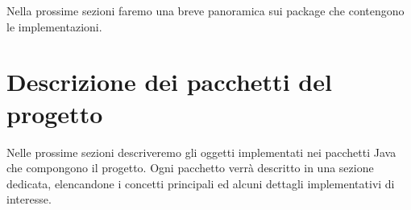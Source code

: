 \documentclass[twoside,openright,titlepage,fleqn,
	headinclude,11pt,a4paper,BCOR5mm,footinclude
	]{scrbook}
\begin{document}


% 

Nella prossime sezioni faremo una breve panoramica sui package che
contengono le implementazioni.

\section{Descrizione dei pacchetti del progetto}
\label{section:packages-descriptions}

Nelle prossime sezioni descriveremo gli oggetti implementati nei
pacchetti Java che compongono il progetto. Ogni pacchetto verr\`a
descritto in una sezione dedicata, elencandone i concetti principali
ed alcuni dettagli implementativi di interesse.







% 


\end{document}
